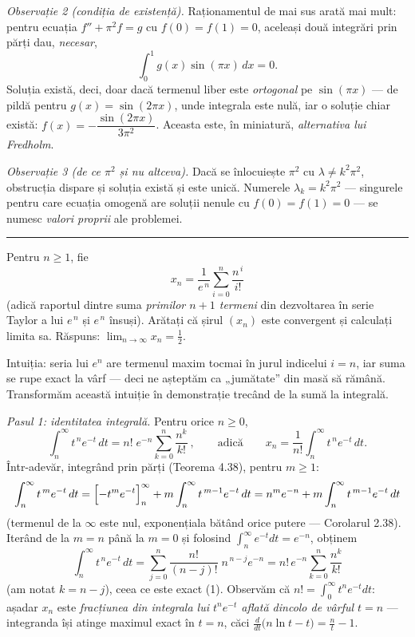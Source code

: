 \emph{Observație 2 (condiția de existență).} Raționamentul de mai sus arată mai mult: pentru ecuația $f''+\pi^{2}f=g$ cu $f(0)=f(1)=0$, aceleași două integrări prin părți dau, \emph{necesar},
\[ \int_{0}^{1}g(x)\sin(\pi x)\,dx=0 . \]
Soluția există, deci, doar dacă termenul liber este \emph{ortogonal} pe $\sin(\pi x)$ --- de pildă pentru $g(x)=\sin(2\pi x)$, unde integrala este nulă, iar o soluție chiar există: $f(x)=-\dfrac{\sin(2\pi x)}{3\pi^{2}}$. Aceasta este, în miniatură, \emph{alternativa lui Fredholm}.

\emph{Observație 3 (de ce $\pi^{2}$ și nu altceva).} Dacă se înlocuiește $\pi^{2}$ cu $\lambda\neq k^{2}\pi^{2}$, obstrucția dispare și soluția există și este unică. Numerele $\lambda_{k}=k^{2}\pi^{2}$ --- singurele pentru care ecuația omogenă are soluții nenule cu $f(0)=f(1)=0$ --- se numesc \emph{valori proprii} ale problemei.
\vspace{1mm}\hrule

Pentru $n\ge1$, fie
\[ x_n=\frac{1}{e^{\,n}}\sum_{i=0}^{n}\frac{n^{\,i}}{i!} \]
(adică raportul dintre suma \emph{primilor $n+1$ termeni} din dezvoltarea în serie Taylor a lui $e^{\,n}$ și $e^{\,n}$ însuși). Arătați că șirul $(x_n)$ este convergent și calculați limita sa.
\sol Răspuns: $\displaystyle\lim_{n\to\infty}x_n=\frac12$.

Intuiția: seria lui $e^n$ are termenul maxim tocmai în jurul indicelui $i=n$, iar suma se rupe exact la vârf --- deci ne așteptăm ca „jumătate'' din masă să rămână. Transformăm această intuiție în demonstrație trecând de la sumă la integrală.

\emph{Pasul 1: identitatea integrală.} Pentru orice $n\ge0$,
\[ \int_n^{\infty}t^{\,n}e^{-t}\,dt=n!\;e^{-n}\sum_{k=0}^{n}\frac{n^{k}}{k!}\ ,\qquad\text{adică}\qquad x_n=\frac{1}{n!}\int_n^{\infty}t^{\,n}e^{-t}\,dt . \tag{1} \]
Într-adevăr, integrând prin părți (Teorema 4.38), pentru $m\ge1$:
\[ \int_n^{\infty}t^{\,m}e^{-t}\,dt=\Bigl[-t^{m}e^{-t}\Bigr]_n^{\infty}+m\int_n^{\infty}t^{\,m-1}e^{-t}\,dt=n^{m}e^{-n}+m\int_n^{\infty}t^{\,m-1}e^{-t}\,dt \]
(termenul de la $\infty$ este nul, exponențiala bătând orice putere --- Corolarul 2.38). Iterând de la $m=n$ până la $m=0$ și folosind $\int_n^\infty e^{-t}dt=e^{-n}$, obținem
\[ \int_n^{\infty}t^{\,n}e^{-t}\,dt=\sum_{j=0}^{n}\frac{n!}{(n-j)!}\;n^{\,n-j}e^{-n}=n!\,e^{-n}\sum_{k=0}^{n}\frac{n^{k}}{k!} \]
(am notat $k=n-j$), ceea ce este exact (1). Observăm că $n!=\int_0^\infty t^n e^{-t}dt$: așadar $x_n$ este \emph{fracțiunea din integrala lui $t^ne^{-t}$ aflată dincolo de vârful $t=n$} --- integranda își atinge maximul exact în $t=n$, căci $\frac{d}{dt}\bigl(n\ln t-t\bigr)=\frac nt-1$.

